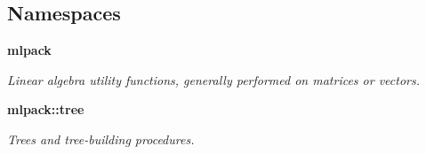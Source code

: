 \subsection*{Namespaces}
\begin{DoxyCompactItemize}
\item 
 \textbf{ mlpack}
\begin{DoxyCompactList}\small\item\em Linear algebra utility functions, generally performed on matrices or vectors. \end{DoxyCompactList}\item 
 \textbf{ mlpack\+::tree}
\begin{DoxyCompactList}\small\item\em Trees and tree-\/building procedures. \end{DoxyCompactList}\end{DoxyCompactItemize}
